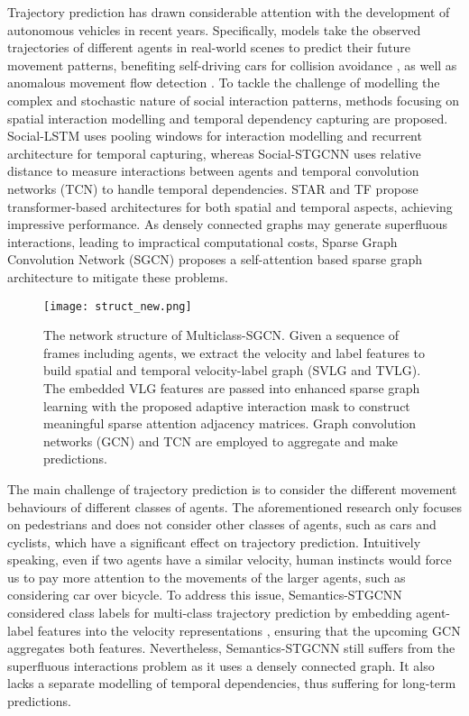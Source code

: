\documentclass{article}
\begin{document}
Trajectory prediction has drawn considerable attention with the development of autonomous vehicles in recent years. Specifically, models take the observed trajectories of different agents in real-world scenes to predict their future movement patterns, benefiting self-driving cars for collision avoidance \cite{liu2021trajectorysurvey}, as well as anomalous movement flow detection \cite{zhou2015dynamic}. To tackle the challenge of modelling the complex and stochastic nature of social interaction patterns,
methods focusing on spatial interaction modelling and temporal dependency capturing are proposed.
Social-LSTM \cite{Alexandre2016lstm} uses pooling windows for interaction modelling and recurrent architecture for temporal capturing, whereas Social-STGCNN \cite{Mohamed2020socialstgcnn} uses relative distance to measure interactions between agents and temporal convolution networks (TCN) \cite{bai2018tcn} to handle temporal dependencies. STAR \cite{YuMa2020Spatio} and TF \cite{giuliari2020Transformer} propose transformer-based \cite{Vaswani2017Transformer} architectures for both spatial and temporal aspects, achieving impressive performance. As densely connected graphs may generate superfluous interactions, leading to impractical computational costs, Sparse Graph Convolution Network (SGCN) \cite{shi2021sgcn} proposes a self-attention based sparse graph architecture to mitigate these problems.


\begin{figure*}
  \texttt{[image: struct\_new.png]}
  \caption{The network structure of Multiclass-SGCN. Given a sequence of  frames including  agents, we extract the velocity and label features to build spatial and temporal velocity-label graph (SVLG and TVLG). The embedded VLG features are passed into enhanced sparse graph learning with the proposed adaptive interaction mask to construct meaningful sparse attention adjacency matrices. Graph convolution networks (GCN) and TCN are employed to aggregate and make predictions.}
  \label{fig:overview}
\end{figure*}



The main challenge of trajectory prediction is to consider the different movement behaviours of different classes of agents. The aforementioned research only focuses on pedestrians and does not consider other classes of agents, such as cars and cyclists, which have a significant effect on trajectory prediction. Intuitively speaking, even if two agents have a similar velocity, human instincts would force us to pay more attention to the movements of the larger agents, such as considering car over bicycle. To address this issue, Semantics-STGCNN \cite{rainbow2021semanticsstgcnn,men21pytorch} considered class labels for multi-class trajectory prediction by embedding agent-label features into the velocity representations \cite{zhang2019semanticskeleton}, ensuring that the upcoming GCN \cite{kipf2016gcn} aggregates both features. Nevertheless, Semantics-STGCNN still suffers from the superfluous interactions problem as it uses a densely connected graph. It also lacks a separate modelling of temporal dependencies, thus suffering for long-term predictions.
\end{document}
